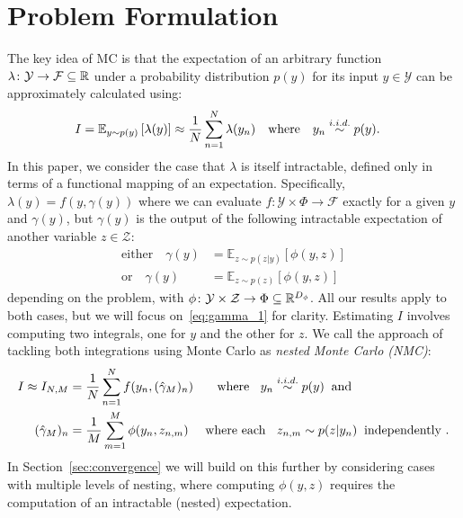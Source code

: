 
\section{Problem Formulation}
\label{sec:prob-form}

The key idea of MC is that the expectation of an arbitrary function 
$\lambda \colon \mathcal{Y} \rightarrow \mathcal{F} \subseteq \mathbb{R}$ under a probability distribution $p(y)$ for its input $y \in \mathcal{Y}$ can be approximately calculated using:
\begin{align}
\label{eq:MC}
I &= \mathbb{E}_{y\sim p(y)} \left[\lambda(y)\right]
\approx \frac{1}{N} \sum_{n=1}^{N} \lambda(y_n) \quad \text{where} \quad y_n \overset{i.i.d.}{\sim} p(y).
\end{align}
In this paper, we consider the case that $\lambda$ is itself intractable, defined only in terms of a functional mapping of an expectation. Specifically, $\lambda(y) = f(y,\gamma(y))$
where we can evaluate $f \colon \mathcal{Y} \times \Phi \rightarrow \mathcal{F}$ exactly for a given $y$ and $\gamma (y)$, but $\gamma(y)$ is the output of the following 
intractable expectation of another variable $z \in \mathcal{Z}$:
\begin{subequations}
	\label{eq:gamma}
	\begin{align}
	\label{eq:gamma_1}
	\text{either}\quad
	\gamma(y) &=  \mathbb{E}_{z\sim p(z | y)} \left[\phi(y,z)\right] \\
	\label{eq:gamma_2}
	\text{or} \quad \gamma(y) &= \mathbb{E}_{z\sim p(z)} \left[\phi(y,z)\right]
	\end{align}
\end{subequations}
depending on the problem, with $\phi \colon \mathcal{Y} \times \mathcal{Z} \rightarrow \Phi \subseteq \mathbb{R}^{D_{\phi}}$.
All our results apply to both cases, but we will focus on~\eqref{eq:gamma_1} for clarity.
Estimating $I$ involves computing two integrals, one for $y$ and the other for $z$. 
We call the approach of tackling both integrations using Monte Carlo 
as \emph{nested Monte Carlo (NMC)}:
\begin{subequations}
\label{eq:nested-mc}
\begin{align}
I \approx I_{N,M} &= \frac{1}{N}  \sum_{n=1}^{N} f(y_n,(\hat{\gamma}_M)_n) \label{eq:nested-outer} \quad \;\;  \text{ where } \;\; y_n \overset{i.i.d.}{\sim} p(y) \;\;  \text{and} \\
(\hat{\gamma}_M)_n &= \frac{1}{M}  \sum_{m=1}^{M}  \phi(y_n,z_{n,m}) \label{eq:nested-inner} \quad
\text{ where each } \;\; z_{n,m} \sim p(z | y_n) \;\; \text{independently }.
\end{align}
\end{subequations}
In Section~\ref{sec:convergence} we will build on this further by considering cases with multiple
levels of nesting, where computing $\phi(y,z)$ requires the computation of an intractable (nested) expectation.

